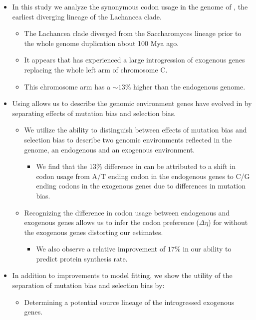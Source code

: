 \documentclass[12pt]{article}
\begin{document}
\begin{itemize}
	\item In this study we analyze the synonymous codon usage in the genome of \kluyveri, the earliest diverging lineage of the Lachancea clade.
	\begin{itemize}
		\item The Lachancea clade diverged from the Saccharomyces lineage prior to the whole genome duplication about 100 Mya ago.
		\item It appears that \kluyveri has experienced a large introgression of exogenous genes replacing the whole left arm of chromosome C. 
		\item This chromosome arm has a \GC  $\sim 13 \%$ higher than the endogenous \kluyveri genome.
	\end{itemize}
	\item Using \ROC allows us to describe the genomic environment genes have evolved in by separating effects of mutation bias and selection bias.
	\begin{itemize}
		\item We utilize the ability to distinguish between effects of mutation bias and selection bias to describe two genomic environments reflected in the \kluyveri genome, an endogenous and an exogenous environment.
		\begin{itemize}
			\item We find that the $13 \%$ difference in \GC can be attributed to  a shift in codon usage from A/T ending codon in the endogenous genes to C/G ending codons in the exogenous genes due to differences in mutation bias.
		\end{itemize}
		\item Recognizing the difference in codon usage between endogenous and exogenous genes allows us to infer the codon preference ($\Delta \eta$) for \kluyveri without the exogenous genes distorting our estimates.
		\begin{itemize}
			\item We also observe a relative improvement of $17 \%$ in our ability to predict protein synthesis rate. 
		\end{itemize}
	\end{itemize}
	\item In addition to improvements to model fitting, we show the utility of the separation of mutation bias and selection bias by:
	\begin{itemize}
		\item Determining a potential source lineage of the introgressed exogenous genes.
		\begin{itemize}

\end{itemize}
\end{itemize}
\end{itemize}
\end{document}
